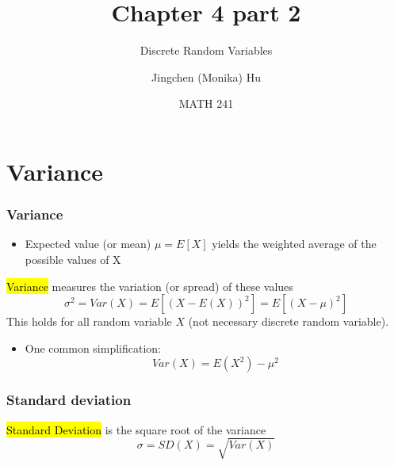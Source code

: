 \documentclass[slidestop,compress,mathserif]{beamer}
\title[Chapter 4 part 2]{Chapter 4 part 2}
\subtitle{Discrete Random Variables}
\author[Jingchen (Monika) Hu] %
{Jingchen (Monika) Hu}
\institute[Vassar] %
{Vassar College}
\date[MATH 241] %
{MATH 241}
\begin{document}


\begin{frame}%
\titlepage
\end{frame}

%
%
%
%
%
%



\section{Variance}

\begin{frame}\frametitle{Variance}

\begin{itemize}
\item Expected value (or mean) $\mu = E[X]$ yields the weighted average of the possible values of X
\end{itemize}

\begin{defn}
\hl{Variance} measures the variation (or spread) of these values
\[\sigma^2 = Var(X) = E\left[ (X-E(X))^2\right] = E\left[(X-\mu)^2 \right] \]
This holds for all random variable $X$ (not necessary discrete random variable).
\end{defn}

\begin{itemize}
\item One common simplification:
\[
Var(X) 	  =  E(X^2)-\mu^2
\]
\end{itemize}


\end{frame}

\begin{frame}\frametitle{Standard deviation}

\begin{defn}
\hl{Standard Deviation} is the square root of the variance
\[\sigma = SD(X) = \sqrt{Var(X)}\]
\end{defn}

\end{frame}
\end{document}
